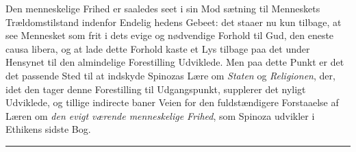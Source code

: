 \documentclass[12pt,a4paper]{book}
\newcommand{\opage}[1]{\marginnote{\footnotesize\textit{[#1]}}}
\begin{document}
Den menneskelige Frihed er saaledes seet i sin Mod\-%
sætning til Menneskets Trældomstilstand indenfor Endelig\-%
hedens Gebeet: det staaer nu kun tilbage, at see Mennesket
som frit i dets evige og nødvendige Forhold til Gud, den
\opage{132} %
eneste causa libera, og at lade dette Forhold kaste et Lys tilbage paa det under Hensynet til den almindelige Forestilling Udviklede. Men paa dette Punkt er det det passende Sted til at indskyde Spinozas Lære om \emph{Staten} og \emph{Religionen}, der, idet den tager denne Forestilling til Udgangspunkt, supplerer det nyligt Udviklede, og tillige indirecte baner Veien for den fuldstændigere Forstaaelse af Læren om \emph{den evigt værende menneskelige Frihed}, som Spinoza udvikler i Ethikens sidste Bog.

\bigskip
\begin{center}\rule{2.5cm}{0.4pt}\end{center}
\bigskip
\end{document}
